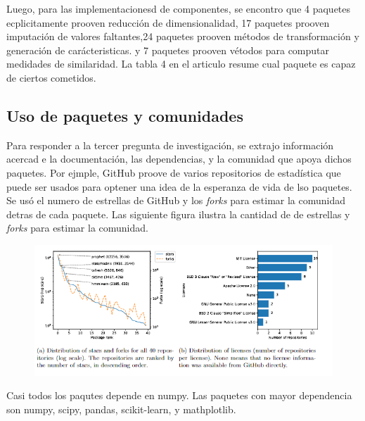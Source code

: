 \documentclass[a4paper, 11pt]{article}
\begin{document}
Luego, para las implementacionesd de componentes, se encontro que 4 paquetes ecplicitamente prooven reducción de dimensionalidad, 17 paquetes prooven imputación de valores faltantes,24 paquetes prooven métodos de transformación y generación de carácteristicas. y 7 paquetes prooven vétodos para computar medidades de similaridad. La tabla 4 en el articulo resume cual paquete es capaz de ciertos cometidos.

\subsection{Uso de paquetes y comunidades}

Para responder a la tercer pregunta de investigación, se extrajo información acercad e la documentación, las dependencias, y la comunidad que apoya dichos paquetes. Por ejmple, GitHub proove de varios repositorios de estadística que puede ser usados para optener una idea de la esperanza de vida de lso paquetes. Se usó el numero de estrellas de GitHub y los \textit{forks} para estimar la comunidad detras de cada paquete. Las siguiente figura ilustra la cantidad de de estrellas y \textit{forks} para estimar la comunidad.

\begin{figure}[H] 
    \centering 
    \includegraphics[width = 16 cm ]{Figures/stars.png } 
    \label{Fig. 02}
\end{figure} 

Casi todos los paqutes depende en numpy. Las paquetes con mayor dependencia son numpy, scipy, pandas, scikit-learn, y mathplotlib.
\end{document}
